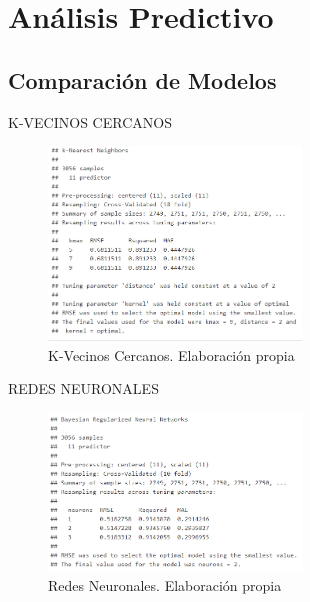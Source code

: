 \chapter{Análisis Predictivo}
\begin{subappendices}
	\label{appendix:A}
\section{Comparación de Modelos}

K-VECINOS CERCANOS
\begin{figure}[htb]
	\centering
	\caption{K-Vecinos Cercanos. Elaboración propia}
		\label{fig:knnSUM}
	\includegraphics[width=0.6\textwidth]{recursos/ImagenesR/knnSUM}
\end{figure}
\FloatBarrier
REDES NEURONALES
\begin{figure}[htb]
	\centering
	\caption{Redes Neuronales. Elaboración propia}
		\label{fig:nnSUM}
	\includegraphics[width=0.6\textwidth]{recursos/ImagenesR/nnSUM}
\end{figure}
\FloatBarrier


\end{subappendices}
